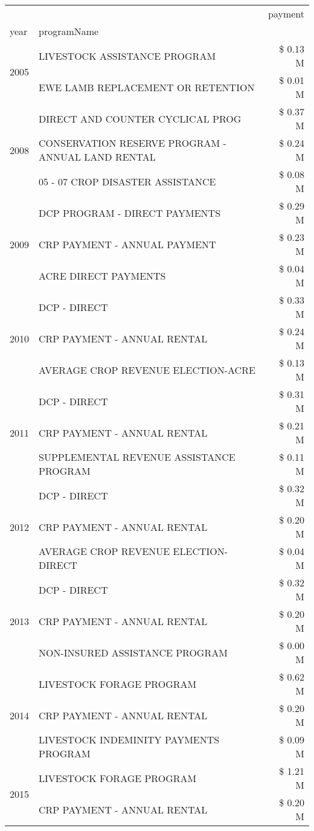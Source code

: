\begin{tabular}{llr}
\toprule
 &  & payment \\
year & programName &  \\
\midrule
\multirow[t]{2}{*}{2005} & LIVESTOCK ASSISTANCE PROGRAM & \$ 0.13 M \\
 & EWE LAMB REPLACEMENT OR RETENTION & \$ 0.01 M \\
\cline{1-3}
\multirow[t]{3}{*}{2008} & DIRECT AND COUNTER CYCLICAL PROG & \$ 0.37 M \\
 & CONSERVATION RESERVE PROGRAM - ANNUAL LAND RENTAL & \$ 0.24 M \\
 & 05 - 07 CROP DISASTER ASSISTANCE & \$ 0.08 M \\
\cline{1-3}
\multirow[t]{3}{*}{2009} & DCP PROGRAM - DIRECT PAYMENTS & \$ 0.29 M \\
 & CRP PAYMENT - ANNUAL PAYMENT & \$ 0.23 M \\
 & ACRE DIRECT PAYMENTS & \$ 0.04 M \\
\cline{1-3}
\multirow[t]{3}{*}{2010} & DCP - DIRECT & \$ 0.33 M \\
 & CRP PAYMENT - ANNUAL RENTAL & \$ 0.24 M \\
 & AVERAGE CROP REVENUE ELECTION-ACRE & \$ 0.13 M \\
\cline{1-3}
\multirow[t]{3}{*}{2011} & DCP - DIRECT & \$ 0.31 M \\
 & CRP PAYMENT - ANNUAL RENTAL & \$ 0.21 M \\
 & SUPPLEMENTAL REVENUE ASSISTANCE PROGRAM & \$ 0.11 M \\
\cline{1-3}
\multirow[t]{3}{*}{2012} & DCP - DIRECT & \$ 0.32 M \\
 & CRP PAYMENT - ANNUAL RENTAL & \$ 0.20 M \\
 & AVERAGE CROP REVENUE ELECTION-DIRECT & \$ 0.04 M \\
\cline{1-3}
\multirow[t]{3}{*}{2013} & DCP - DIRECT & \$ 0.32 M \\
 & CRP PAYMENT - ANNUAL RENTAL & \$ 0.20 M \\
 & NON-INSURED ASSISTANCE PROGRAM & \$ 0.00 M \\
\cline{1-3}
\multirow[t]{3}{*}{2014} & LIVESTOCK FORAGE PROGRAM & \$ 0.62 M \\
 & CRP PAYMENT - ANNUAL RENTAL & \$ 0.20 M \\
 & LIVESTOCK INDEMINITY PAYMENTS PROGRAM & \$ 0.09 M \\
\cline{1-3}
\multirow[t]{3}{*}{2015} & LIVESTOCK FORAGE PROGRAM & \$ 1.21 M \\
 & CRP PAYMENT - ANNUAL RENTAL & \$ 0.20 M \\

\end{tabular}
